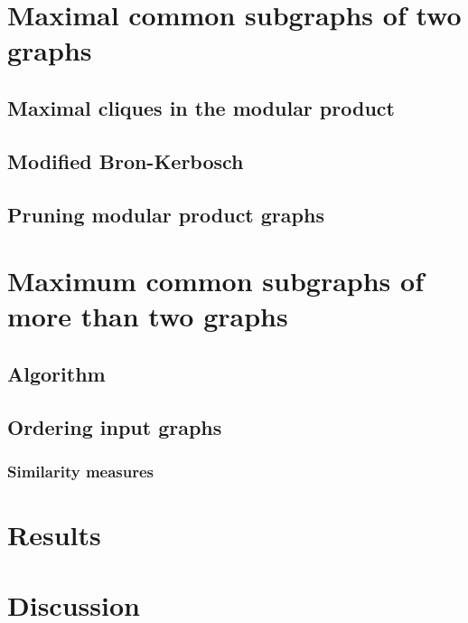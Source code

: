 \documentclass{article}
\begin{document}
\section{Maximal common subgraphs of two graphs}

\subsection{Maximal cliques in the modular product}

\subsection{Modified Bron-Kerbosch}

\subsection{Pruning modular product graphs}


\section{Maximum common subgraphs of more than two graphs}

\subsection{Algorithm}

\subsection{Ordering input graphs}

\subsubsection{Similarity measures}



\section{Results}



\section{Discussion}
\end{document}
